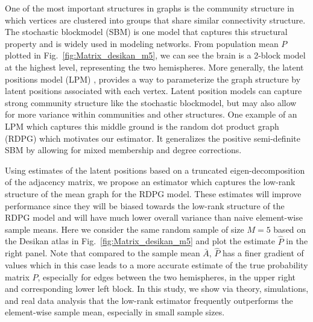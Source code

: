 \documentclass[10pt,letterpaper]{article}
\renewcommand{\hat}{\widehat}
\begin{document}
One of the most important structures in graphs is the community structure in which vertices are clustered into groups that share similar connectivity structure. The stochastic blockmodel (SBM) \citep{holland1983stochastic} is one model that captures this structural property and is widely used in modeling networks. From population mean $P$ plotted in Fig.~\ref{fig:Matrix_desikan_m5}, we can see the brain is a 2-block model at the highest level, representing the two hemispheres.
More generally, the latent positions model (LPM) \citep{hoff2002latent}, provides a way to parameterize the graph structure by latent positions associated with each vertex. 
Latent position models can capture strong community structure like the stochastic blockmodel, but may also allow for more variance within communities and other structures.
One example of an LPM which captures this middle ground is the random dot product graph (RDPG) \citep{young2007random, nickel2007random} which motivates our estimator. It generalizes the positive semi-definite SBM by allowing for mixed membership and degree corrections.

Using estimates of the latent positions based on a truncated eigen-decomposition of the adjacency matrix, we propose an estimator which captures the low-rank structure of the mean graph for the RDPG model.
These estimates will improve performance since they will be biased towards the low-rank structure of the RDPG model and will have much lower overall variance than naive element-wise sample means. Here we consider the same random sample of size $M=5$ based on the Desikan atlas in Fig.~\ref{fig:Matrix_desikan_m5} and plot the estimate $\hat{P}$ in the right panel. Note that compared to the sample mean $\bar{A}$, $\hat{P}$ has a finer gradient of values which in this case leads to a more accurate estimate of the true probability matrix $P$, especially for edges between the two hemispheres, in the upper right and corresponding lower left block.
In this study, we show via theory, simulations, and real data analysis that the low-rank estimator frequently outperforms the element-wise sample mean, especially in small sample sizes.
\end{document}
